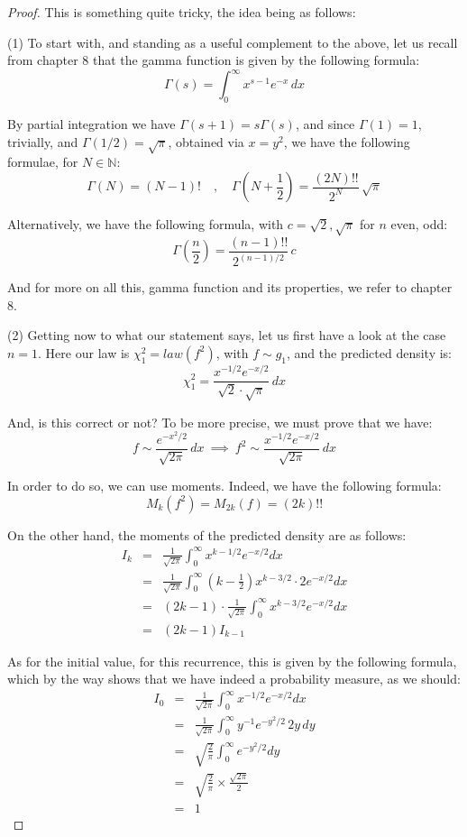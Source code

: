 \documentclass[12pt]{amsbook}
\begin{document}
\begin{proof}
This is something quite tricky, the idea being as follows:

\medskip

(1) To start with, and standing as a useful complement to the above, let us recall from chapter 8 that the gamma function is given by the following formula:
$$\Gamma(s)=\int_0^\infty x^{s-1}e^{-x}\,dx$$

By partial integration we have $\Gamma(s+1)=s\Gamma(s)$, and since $\Gamma(1)=1$, trivially, and $\Gamma(1/2)=\sqrt{\pi}$, obtained via $x=y^2$, we have the following formulae, for $N\in\mathbb N$:
$$\Gamma(N)=(N-1)!\quad,\quad\Gamma\left(N+\frac{1}{2}\right)=\frac{(2N)!!}{2^N}\,\sqrt{\pi}$$

Alternatively, we have the following formula, with $c=\sqrt{2},\sqrt{\pi}$ for $n$ even, odd:
$$\Gamma\left(\frac{n}{2}\right)=\frac{(n-1)!!}{2^{(n-1)/2}}\,c$$

And for more on all this, gamma function and its properties, we refer to chapter 8.

\medskip

(2) Getting now to what our statement says, let us first have a look at the case $n=1$. Here our law is $\chi_1^2=law(f^2)$, with $f\sim g_1$, and the predicted density is:
$$\chi_1^2=\frac{x^{-1/2}e^{-x/2}}{\sqrt{2}\cdot\sqrt{\pi}}\,dx$$

And, is this correct or not? To be more precise, we must prove that we have:
$$f\sim\frac{e^{-x^2/2}}{\sqrt{2\pi}}\,dx\ \implies\ f^2\sim\frac{x^{-1/2}e^{-x/2}}{\sqrt{2\pi}}\,dx$$

In order to do so, we can use moments. Indeed, we have the following formula:
$$M_k(f^2)=M_{2k}(f)=(2k)!!$$

On the other hand, the moments of the predicted density are as follows:
\begin{eqnarray*}
I_k
&=&\frac{1}{\sqrt{2\pi}}\int_0^\infty x^{k-1/2}e^{-x/2}dx\\
&=&\frac{1}{\sqrt{2\pi}}\int_0^\infty\left(k-\frac{1}{2}\right)x^{k-3/2}\cdot 2e^{-x/2}dx\\
&=&(2k-1)\cdot\frac{1}{\sqrt{2\pi}}\int_0^\infty x^{k-3/2}e^{-x/2}dx\\
&=&(2k-1)I_{k-1}
\end{eqnarray*}

As for the initial value, for this recurrence, this is given by the following formula, which by the way shows that we have indeed a probability measure, as we should:
\begin{eqnarray*}
I_0
&=&\frac{1}{\sqrt{2\pi}}\int_0^\infty x^{-1/2}e^{-x/2}dx\\
&=&\frac{1}{\sqrt{2\pi}}\int_0^\infty y^{-1}e^{-y^2/2}\,2y\,dy\\
&=&\sqrt{\frac{2}{\pi}}\int_0^\infty e^{-y^2/2}dy\\
&=&\sqrt{\frac{2}{\pi}}\times\frac{\sqrt{2\pi}}{2}\\
&=&1
\end{eqnarray*}


\end{proof}
\end{document}
